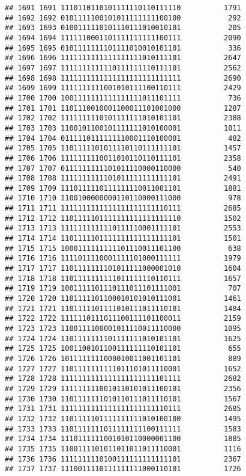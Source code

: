 \documentclass[]{article}
\begin{document}
\begin{verbatim}
## 1691 1691 1110110110101111110110111110          1791
## 1692 1692 0101111100101011111111100100           292
## 1693 1693 0100111110101110111010010101           205
## 1694 1694 1111110001101111111111100111          2090
## 1695 1695 0101111111101111010010101101           336
## 1696 1696 1111111111111111111010111101          2647
## 1697 1697 1111111111110111111110111101          2562
## 1698 1698 1111111111111111111111111111          2690
## 1699 1699 1111111111001010111100110111          2429
## 1700 1700 1001111111111111111011101111           736
## 1701 1701 1101110010001100011101001000          1287
## 1702 1702 1111111110101111111010101101          2388
## 1703 1703 1100101100101111111010100001          1011
## 1704 1704 0111110111111110001110100001           482
## 1705 1705 1101111101011110110111111101          1457
## 1706 1706 1111111110011010110110111101          2358
## 1707 1707 0111111111101011110000110000           540
## 1708 1708 1111111111101011111111111101          2491
## 1709 1709 1110111110111111110011001101          1881
## 1710 1710 1100100000000110110000111000           978
## 1711 1711 1111111111111111111111110111          2685
## 1712 1712 1101111101111111111111111110          1502
## 1713 1713 1111111111110111110001111101          2553
## 1714 1714 1101111101111111111111111101          1501
## 1715 1715 1000111111111101110011101100           638
## 1716 1716 1111011110001111101000111111          1979
## 1717 1717 1101111111101011111000001010          1604
## 1718 1718 1101111111111011111110110111          1657
## 1719 1719 1001111101110111011101111001           707
## 1720 1720 1101111101100010101010111001          1461
## 1721 1721 1101111101111010111011110101          1484
## 1722 1722 1111110111011100111101100011          2159
## 1723 1723 1100111100001011110011110000          1095
## 1724 1724 1101111111101111111010101101          1625
## 1725 1725 1001100101100111111110101101           655
## 1726 1726 1011111111000010011001101101           889
## 1727 1727 1101111111111011101011110001          1652
## 1728 1728 1111111111111111111111101111          2682
## 1729 1729 1111111110010110101011100101          2356
## 1730 1730 1101111111010110111011110101          1567
## 1731 1731 1111111111111111111111110111          2685
## 1732 1732 1101111101111111111010100100          1495
## 1733 1733 1101111111011111111100111111          1583
## 1734 1734 1110111111001010110000001100          1885
## 1735 1735 1100111101011011011011110001          1116
## 1736 1736 1111111110100111111111111101          2367
## 1737 1737 1110011110111111111000110101          1726

\end{verbatim}
\end{document}
